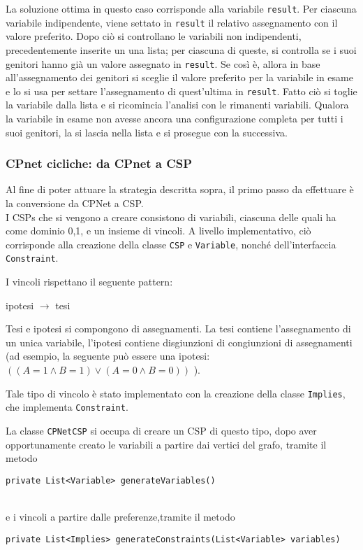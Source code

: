 La soluzione ottima in questo caso corrisponde alla variabile \texttt{result}.
Per ciascuna variabile indipendente, viene settato in \texttt{result} il relativo assegnamento con il valore preferito.
Dopo ciò si controllano le variabili non indipendenti, precedentemente inserite un una lista; per ciascuna di queste, si controlla se i suoi genitori hanno già un valore assegnato in \texttt{result}. Se così è, allora in base all'assegnamento dei genitori si sceglie il valore preferito per la variabile in esame e lo si usa per settare l'assegnamento di quest'ultima in \texttt{result}. Fatto ciò si toglie la variabile dalla lista e si ricomincia l'analisi con le rimanenti variabili. Qualora la variabile in esame non avesse ancora una configurazione completa per tutti i suoi genitori, la si lascia nella lista e si prosegue con la successiva.

\subsubsection{CPnet cicliche: da CPnet a CSP}
Al fine di poter attuare la strategia descritta sopra, il primo passo da effettuare è la conversione da CPNet a CSP. 
\\
I CSPs che si vengono a creare consistono di variabili, ciascuna delle quali ha come dominio {0,1}, e un insieme di vincoli.
A livello implementativo, ciò corrisponde alla creazione della classe \texttt{CSP} e \texttt{Variable}, nonché dell'interfaccia \texttt{Constraint}.
 
I vincoli rispettano il seguente pattern:
\\
\centerline{ipotesi $\rightarrow$ tesi}

Tesi e ipotesi si compongono di assegnamenti. La tesi contiene l'assegnamento di un unica variabile, l'ipotesi contiene disgiunzioni di congiunzioni di assegnamenti (ad esempio, la seguente può essere una ipotesi: $( (A=1 \land B=1) \lor (A=0 \land B=0))$ ). 

Tale tipo di vincolo è stato implementato con la creazione della classe \texttt{Implies}, che implementa \texttt{Constraint}.


La classe \texttt{CPNetCSP} si occupa di creare un CSP di questo tipo, dopo aver opportunamente creato le variabili a partire dai vertici del grafo, tramite il metodo
\\
\centerline{\texttt{private List<Variable> generateVariables()}}
\\
e i vincoli a partire dalle preferenze,tramite il metodo
\\
\centerline{\texttt{private List<Implies> generateConstraints(List<Variable> variables)}}
\\

